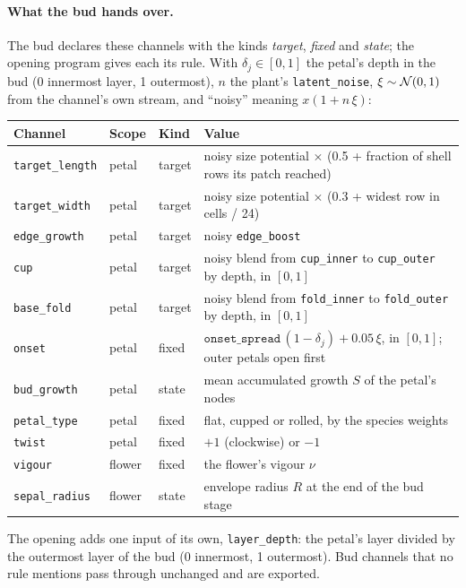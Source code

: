 \paragraph{What the bud hands over.} The bud declares these channels with the
kinds \emph{target}, \emph{fixed} and \emph{state}; the opening program gives
each its rule. With $\delta_j\in[0,1]$ the petal's depth
in the bud (0 innermost layer, 1 outermost), $n$ the plant's
\texttt{latent\_noise}, $\xi\sim\mathcal{N}(0,1)$ from the channel's own stream, and
``noisy'' meaning $x(1 + n\,\xi)$:
\begin{center}\small
\begin{tabularx}{\linewidth}{@{}l l l X@{}}
\toprule
Channel & Scope & Kind & Value \\
\midrule
\texttt{target\_length} & petal & target & noisy size potential $\times$ (0.5 + fraction of shell rows its patch reached) \\
\texttt{target\_width} & petal & target & noisy size potential $\times$ (0.3 + widest row in cells / 24) \\
\texttt{edge\_growth} & petal & target & noisy \texttt{edge\_boost} \\
\texttt{cup} & petal & target & noisy blend from \texttt{cup\_inner} to \texttt{cup\_outer} by depth, in $[0,1]$ \\
\texttt{base\_fold} & petal & target & noisy blend from \texttt{fold\_inner} to \texttt{fold\_outer} by depth, in $[0,1]$ \\
\texttt{onset} & petal & fixed & $\texttt{onset\_spread}\,(1-\delta_j) + 0.05\,\xi$, in $[0,1]$; outer petals open first \\
\texttt{bud\_growth} & petal & state & mean accumulated growth $S$ of the petal's nodes \\
\texttt{petal\_type} & petal & fixed & flat, cupped or rolled, by the species weights \\
\texttt{twist} & petal & fixed & $+1$ (clockwise) or $-1$ \\
\texttt{vigour} & flower & fixed & the flower's vigour $\nu$ \\
\texttt{sepal\_radius} & flower & state & envelope radius $R$ at the end of the bud stage \\
\bottomrule
\end{tabularx}
\end{center}

The opening adds one input of its own, \texttt{layer\_depth}: the petal's
layer divided by the outermost layer of the bud (0 innermost, 1 outermost).
Bud channels that no rule mentions pass through unchanged and are exported.

